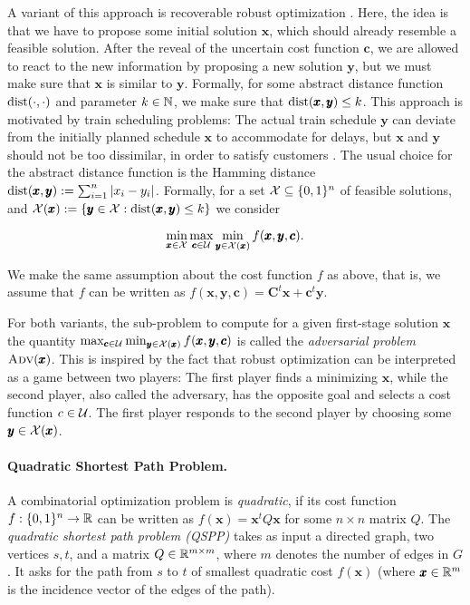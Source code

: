 A variant of this approach is recoverable robust optimization \cite{liebchen2009concept}. Here, the idea is that we have to propose some initial solution $\pmb x$, which should already resemble a feasible solution. 
After the reveal of the uncertain cost function $\pmb c$, we are allowed to react to the new information by proposing a new solution $\pmb y$, but we must make sure that $\pmb x$ is similar to $\pmb y$. Formally, for some abstract distance function $\operatorname{\text{dist}}(\cdot, \cdot)$ and parameter $k \in \mathbb{N}$, we make sure that $\operatorname{\text{dist}}(\pmb x,\pmb y) \leq k$. This approach is motivated by train scheduling problems: The actual train schedule $\pmb y$ can deviate from the initially planned schedule $\pmb x$ to accommodate for delays, but $\pmb x$ and $\pmb y$ should not be too dissimilar, in order to satisfy customers \cite{liebchen2009concept}. The usual choice for the abstract distance function is the Hamming distance $\operatorname{\text{dist}}(\pmb x,\pmb y) := \sum_{i=1}^n |x_i - y_i|$. Formally, for a set $\mathcal{X} \subseteq \{ 0,1 \}^n$ of feasible solutions, and $\mathcal{X}(\pmb x) := \{ \pmb y \in \mathcal{X} : \operatorname{\text{dist}}(\pmb x,\pmb y) \leq k \}$ we consider

\[\min_{\pmb x \in \mathcal{X}} \max_{\pmb c \in \mathcal{U}} \min_{\pmb y \in \mathcal{X}(\pmb x)} f(\pmb x,\pmb y,\pmb c).\]

We make the same assumption about the cost function $f$ as above, that is, we assume that $f$ can be written as  $f(\pmb x,\pmb y,\pmb c) = \pmb C^t\pmb x + \pmb c^t\pmb y$. 

For both variants, the sub-problem to compute for a given first-stage solution $\pmb x$ the quantity $\max_{\pmb c \in \mathcal{U}} \min_{\pmb y \in \mathcal{X}(\pmb x)} f(\pmb x,\pmb y,\pmb c)$ is called the \emph{adversarial problem} $\textsc{Adv}(\pmb x)$. 
This is inspired by the fact that robust optimization can be interpreted as a game between two players: The first player finds a minimizing $\pmb x$, while the second player, also called the adversary, has the opposite goal and selects a cost function $c \in \mathcal{U}$. The first player responds to the second player by choosing some $\pmb y \in \mathcal{X}(\pmb x)$.

\paragraph*{Quadratic Shortest Path Problem.}
A combinatorial optimization problem is \emph{quadratic}, if its cost function $f : \{ 0,1 \}^n \to \mathbb{R}$ can be written as $f(\pmb x) = \pmb x^tQ\pmb x$ for some $n \times n$ matrix $Q$. The \emph{quadratic shortest path problem (QSPP)} takes as input a directed graph, two vertices $s,t$, and a matrix $Q \in \mathbb{R}^{m \times m}$, where $m$ denotes the number of edges in $G$. It asks for the path from $s$ to $t$ of smallest quadratic cost $f(\pmb x)$ (where $\pmb x \in \mathbb{R}^m$ is the incidence vector of the edges of the path). 

